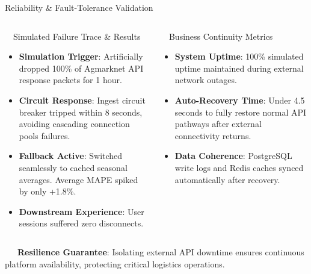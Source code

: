 \documentclass{beamer}
\begin{document}
\begin{frame}{Reliability \& Fault-Tolerance Validation}
\vspace{-0.2cm}

\begin{columns}[T]
    \begin{column}{0.48\textwidth}
        \begin{alertcard}[height=5.2cm]{~~Simulated Failure Trace \& Results}
            \fontsize{6.8pt}{8.5pt}\selectfont
            \begin{itemize}\setlength\itemsep{3pt}\setlength\parskip{0pt}
                \item \textbf{Simulation Trigger}: Artificially dropped 100\% of Agmarknet API response packets for 1 hour.
                \item \textbf{Circuit Response}: Ingest circuit breaker tripped within 8 seconds, avoiding cascading connection pools failures.
                \item \textbf{Fallback Active}: Switched seamlessly to cached seasonal averages. Average MAPE spiked by only +1.8\%.
                \item \textbf{Downstream Experience}: User sessions suffered zero disconnects.
            \end{itemize}
        \end{alertcard}
    \end{column}
    
    \begin{column}{0.48\textwidth}
        \begin{successcard}[height=5.2cm]{~~Business Continuity Metrics}
            \fontsize{6.8pt}{8.2pt}\selectfont
            \begin{itemize}\setlength\itemsep{3.5pt}\setlength\parskip{0pt}
                \item \textbf{System Uptime}: 100\% simulated uptime maintained during external network outages.
                \item \textbf{Auto-Recovery Time}: Under 4.5 seconds to fully restore normal API pathways after external connectivity returns.
                \item \textbf{Data Coherence}: PostgreSQL write logs and Redis caches synced automatically after recovery.
            \end{itemize}
        \end{successcard}
    \end{column}
\end{columns}

\vspace{0.15cm}
\begin{tcolorbox}[enhanced, colback=primaryblue!4, colframe=primaryblue!30, boxrule=0.35pt,
  arc=3.5pt, width=0.98\textwidth, left=4pt, right=4pt, top=2.5pt, bottom=2.5pt, boxsep=0pt,
  halign=center, shadow={0.5pt}{-0.5pt}{0pt}{black!8}]
    \fontsize{5.5pt}{6.5pt}\selectfont
    \textcolor{primaryDark}{~~~\textbf{Resilience Guarantee}: Isolating external API downtime ensures continuous platform availability, protecting critical logistics operations.}
\end{tcolorbox}
\end{frame}
\end{document}
